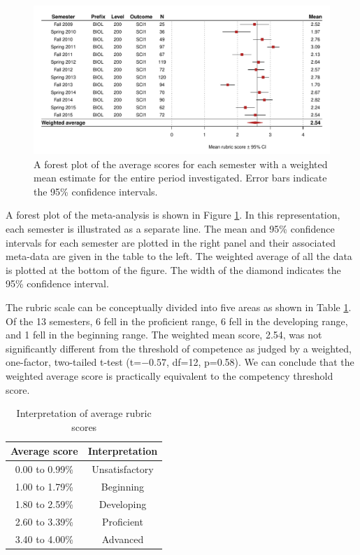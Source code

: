 \documentclass[fleqn,10pt]{SelfArx}\usepackage[]{graphicx}\usepackage[]{color}
\begin{document}
\begin{figure}[htb]\centering %

\includegraphics[width=\textwidth]{./figure/forest}
\protect\caption{A forest plot of the average scores for each semester with a weighted mean estimate for the entire period investigated. Error bars indicate the 95\% confidence intervals.}
\label{fig:forest}
\end{figure}



A forest plot of the meta-analysis is shown in Figure \ref{fig:forest}. In this representation, each semester is illustrated as a separate line. The mean and 95\% confidence intervals for each semester are plotted in the right panel and their associated meta-data are given in the table to the left. The weighted average of all the data is plotted at the bottom of the figure. The width of the diamond indicates the 95\% confidence interval.

The rubric scale can be conceptually divided into five areas as shown in Table \ref{tab:regions}. Of the 13 semesters, 6 fell in the proficient range, 6 fell in the developing range, and 1 fell in the beginning range. The weighted mean score, 2.54, was not significantly different from the threshold of competence as judged by a weighted, one-factor, two-tailed t-test (t=\ensuremath{-0.57}, df=12, p=0.58). We can conclude that the weighted average score is practically equivalent to the competency threshold score.

\begin{table}[hbt]
\caption{Interpretation of average rubric scores}
\centering
\begin{tabular}{c c}
\textbf{Average score} & \textbf{Interpretation}   \\
\hline
0.00 to 0.99\%   &   Unsatisfactory                                \\
1.00 to 1.79\%   &   Beginning                                     \\
1.80 to 2.59\%   &   Developing                                    \\
2.60 to 3.39\%   &   Proficient                                    \\
3.40 to 4.00\%   &   Advanced                                      \\
\end{tabular}
\label{tab:regions}
\end{table}
\end{document}
